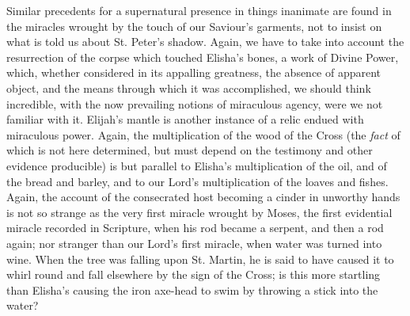 Similar precedents for a supernatural presence in
things inanimate are found in the miracles wrought by the touch of our
Saviour's garments, not to insist on what is told us about St. Peter's
shadow. Again, we have to take into account the resurrection of the
corpse which touched Elisha's bones, a work of Divine Power, which,
whether considered in its appalling greatness, the absence of apparent
object, and the means through which it was accomplished, we should
think incredible, with the now prevailing notions of miraculous
agency, were we not familiar with it. Elijah's mantle is another
instance of a relic endued with miraculous power. Again, the
multiplication of the wood of the Cross (the \emph{fact} of which is not here
determined, but must depend on the testimony and other evidence
producible) is but parallel to Elisha's multiplication of the oil, and
of the bread and barley, and to our Lord's multiplication of the
loaves and fishes. Again, the account of the consecrated host becoming
a cinder in unworthy hands is not so strange as the very first miracle
wrought by Moses, the first evidential miracle recorded in Scripture,
when his rod became a serpent, and then a rod again; nor stranger than
our Lord's first miracle, when water was turned into wine. When the
tree was falling upon St. Martin, he is said to have caused it to
whirl round and fall elsewhere by the sign of the Cross; is this more
startling than Elisha's causing the iron axe-head to swim by
throwing a stick into the water?


